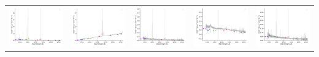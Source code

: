 \begin{center}
\begin{longtable}{l l l l l }
    \includegraphics[width=0.2\linewidth, clip]{Figs/Figs-sdss/spec-0410-51877-0217-STRIPE82-0063-024542.pdf} & \includegraphics[width=0.2\linewidth, clip]{Figs/Figs-sdss/spec-0410-51877-0492-STRIPE82-0064-042346.pdf} & \includegraphics[width=0.2\linewidth, clip]{Figs/Figs-sdss/spec-0410-51877-0519-STRIPE82-0064-031755.pdf} & \includegraphics[width=0.2\linewidth, clip]{Figs/Figs-sdss/spec-0410-51877-0527-STRIPE82-0064-069216.pdf} & \includegraphics[width=0.2\linewidth, clip]{Figs/Figs-sdss/spec-0501-52235-0474-SPLUS-n03n01-003922.pdf} \\

\end{longtable}
\end{center}
